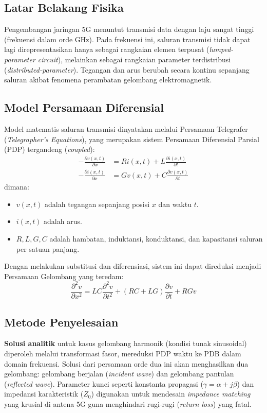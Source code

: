 \documentclass[12pt,a4paper]{article}
\theoremstyle{definition}
\begin{document}
\subsection{Latar Belakang Fisika}
Pengembangan jaringan 5G menuntut transmisi data dengan laju sangat tinggi (frekuensi dalam orde GHz). Pada frekuensi ini, saluran transmisi tidak dapat lagi direpresentasikan hanya sebagai rangkaian elemen terpusat (\textit{lumped-parameter circuit}), melainkan sebagai rangkaian parameter terdistribusi (\textit{distributed-parameter}). Tegangan dan arus berubah secara kontinu sepanjang saluran akibat fenomena perambatan gelombang elektromagnetik.

\subsection{Model Persamaan Diferensial}
Model matematis saluran transmisi dinyatakan melalui Persamaan Telegrafer (\textit{Telegrapher's Equations}), yang merupakan sistem Persamaan Diferensial Parsial (PDP) tergandeng (\textit{coupled}):
\begin{align}
    -\frac{\partial v(x,t)}{\partial x} &= R i(x,t) + L \frac{\partial i(x,t)}{\partial t} \\
    -\frac{\partial i(x,t)}{\partial x} &= G v(x,t) + C \frac{\partial v(x,t)}{\partial t}
\end{align}
dimana:
\begin{itemize}
    \item $v(x,t)$ adalah tegangan sepanjang posisi $x$ dan waktu $t$.
    \item $i(x,t)$ adalah arus.
    \item $R, L, G, C$ adalah hambatan, induktansi, konduktansi, dan kapasitansi saluran per satuan panjang.
\end{itemize}
Dengan melakukan substitusi dan diferensiasi, sistem ini dapat direduksi menjadi Persamaan Gelombang yang teredam:
\begin{equation}
    \frac{\partial^2 v}{\partial x^2} = L C \frac{\partial^2 v}{\partial t^2} + (R C + L G) \frac{\partial v}{\partial t} + R G v
\end{equation}

\subsection{Metode Penyelesaian}
\textbf{Solusi analitik} untuk kasus gelombang harmonik (kondisi tunak sinusoidal) diperoleh melalui transformasi fasor, mereduksi PDP waktu ke PDB dalam domain frekuensi. Solusi dari persamaan orde dua ini akan menghasilkan dua gelombang: gelombang berjalan (\textit{incident wave}) dan gelombang pantulan (\textit{reflected wave}). Parameter kunci seperti konstanta propagasi ($\gamma = \alpha + j\beta$) dan impedansi karakteristik ($Z_0$) digunakan untuk mendesain \textit{impedance matching} yang krusial di antena 5G guna menghindari rugi-rugi (\textit{return loss}) yang fatal.
\end{document}
